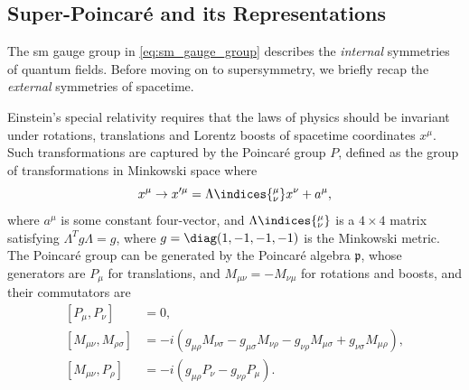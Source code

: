 \subsection{Super-Poincar\'e and its Representations}\label{sec:super_poincare}

The \gls{sm} gauge group in \cref{eq:sm_gauge_group} describes the \emph{internal} symmetries of quantum fields. Before moving on to supersymmetry, we briefly recap the \emph{external} symmetries of spacetime.

Einstein's special relativity requires that the laws of physics should be invariant under rotations, translations and Lorentz boosts of spacetime coordinates $x^\mu$.
Such transformations are captured by the Poincar\'e group $P$, defined as the group of transformations in Minkowski space where
\begin{equation}
    x^\mu \to x'^\mu = \Lambda\indices{^\mu_\nu} x^\nu + a^\mu,
\end{equation}
where $a^\mu$ is some constant four-vector, and $\Lambda\indices{^\mu_\nu}$ is a $4\times4$ matrix satisfying $\Lambda^T g \Lambda = g$, where $g=\diag(1,-1,-1,-1)$ is the Minkowski metric.
The Poincar\'e group can be generated by the Poincar\'e algebra $\mathfrak{p}$, whose generators are $P_\mu$ for translations, and $M_{\mu\nu}=-M_{\nu\mu}$ for rotations and boosts, and their commutators are
\begin{subequations}
\label{eq:poincare_algebra}
\begin{align}
    [P_\mu,P_\nu] &= 0,
    \\
    [M_{\mu\nu},M_{\rho\sigma}] &= -i(g_{\mu\rho} M_{\nu\sigma} - g_{\mu\sigma} M_{\nu\rho} - g_{\nu\rho} M_{\mu\sigma} + g_{\nu\sigma } M_{\mu\rho}),
    \\
    [M_{\mu\nu}, P_\rho] &= -i(g_{\mu\rho}P_\nu - g_{\nu\rho}P_\mu).
\end{align}
\end{subequations}

